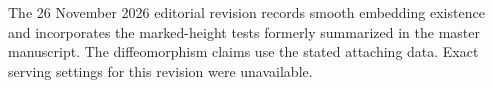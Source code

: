\documentclass[11pt,letterpaper]{article}
\numberwithin{equation}{section}
\begin{document}
The 26 November 2026 editorial revision records smooth embedding
existence and incorporates the marked-height tests formerly summarized
in the master manuscript. The diffeomorphism claims use the stated
attaching data. Exact serving settings for this revision were unavailable.



\end{document}
